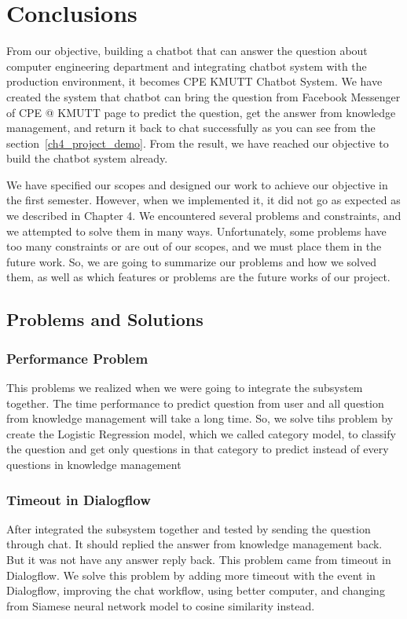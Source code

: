 \documentclass[12pt,oneside,openright,a4paper]{cpe-english-project}
\begin{document}
\chapter{Conclusions}

From our objective, building a chatbot that can answer the question about computer engineering department
and integrating chatbot system with the production environment, it becomes CPE KMUTT Chatbot System.
We have created the system that chatbot can bring the question from Facebook Messenger of CPE @ KMUTT page
to predict the question, get the answer from knowledge management, and return it back to chat successfully
as you can see from the section~\ref*{ch4_project_demo}.
From the result, we have reached our objective to build the chatbot system already.

We have specified our scopes and designed our work to achieve our objective in the first semester.
However, when we implemented it, it did not go as expected as we described in Chapter 4.
We encountered several problems and constraints, and we attempted to solve them in many ways.
Unfortunately, some problems have too many constraints or are out of our scopes,
and we must place them in the future work.
So, we are going to summarize our problems and how we solved them,
as well as which features or problems are the future works of our project.

\section{Problems and Solutions}
\subsection{Performance Problem}
This problems we realized when we were going to integrate the subsystem together.
The time performance to predict question from user and all question from knowledge management
will take a long time. So, we solve tihs problem by create the Logistic Regression model,
which we called category model, to classify the question and get only questions in that
category to predict instead of every questions in knowledge management

\subsection{Timeout in Dialogflow}
\label{ch5_timeout_dialogflow}
After integrated the subsystem together and tested by sending the question through chat.
It should replied the answer from knowledge management back.
But it was not have any answer reply back. This problem came from timeout in Dialogflow.
We solve this problem by adding more timeout with the event in Dialogflow, improving the
chat workflow, using better computer,
and changing from Siamese neural network model to cosine similarity instead.
\end{document}

